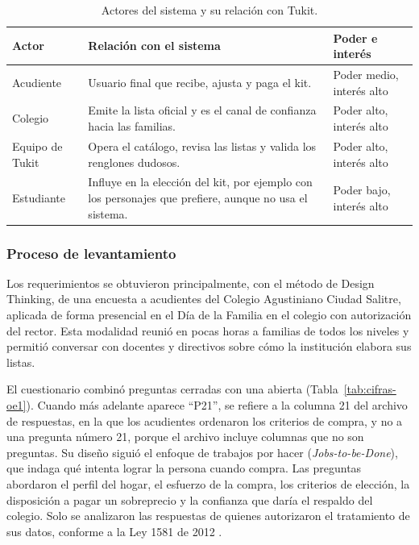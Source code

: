 \begin{table}[!htb]
\centering\footnotesize
\setlength{\tabcolsep}{4pt}
\renewcommand{\arraystretch}{1.25}
\caption{Actores del sistema y su relación con Tukit.}
\label{tab:actores}
\begin{tabularx}{\textwidth}{@{}p{2.6cm}Xp{3.2cm}@{}}
\toprule
\textbf{Actor} & \textbf{Relación con el sistema} & \textbf{Poder e interés} \\
\midrule
Acudiente & Usuario final que recibe, ajusta y paga el kit. & Poder medio, interés alto \\
Colegio & Emite la lista oficial y es el canal de confianza hacia las familias. & Poder
alto, interés alto \\
Equipo de Tukit & Opera el catálogo, revisa las listas y valida los renglones dudosos. &
Poder alto, interés alto \\
Estudiante & Influye en la elección del kit, por ejemplo con los personajes que prefiere,
aunque no usa el sistema. & Poder bajo, interés alto \\
\bottomrule
\end{tabularx}
\end{table}

\subsubsection{Proceso de levantamiento}

Los requerimientos se obtuvieron principalmente, con el método de Design Thinking, de una encuesta a acudientes del
Colegio Agustiniano Ciudad Salitre, aplicada de forma presencial en el Día de la Familia en el
colegio con autorización del rector. Esta modalidad reunió en pocas horas a familias de todos los niveles y
permitió conversar con docentes y directivos sobre cómo la institución elabora sus listas.\par

El cuestionario combinó preguntas cerradas con una abierta (Tabla~\ref{tab:cifras-oe1}). Cuando más adelante aparece ``P21'', se refiere a la columna 21 del archivo de respuestas, en la que los acudientes ordenaron los criterios de compra, y no a una pregunta número 21, porque el archivo incluye columnas que no son preguntas. Su diseño siguió el enfoque de trabajos por hacer (\emph{Jobs-to-be-Done}), que indaga qué intenta
lograr la persona cuando compra. Las
preguntas abordaron el perfil del hogar, el esfuerzo de la compra, los criterios de elección, la
disposición a pagar un sobreprecio y la confianza que daría el respaldo del colegio. Solo se analizaron las respuestas de quienes autorizaron el tratamiento de sus datos,
conforme a la Ley 1581 de 2012 \citep{congreso_ley1581_2012}.\par

